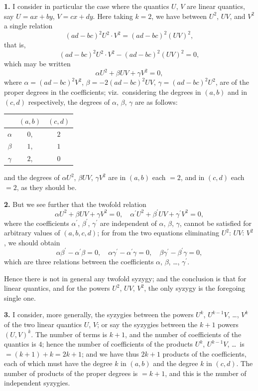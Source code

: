 \documentclass[11pt,a4paper]{book}
\begin{document}
{{{\textbf{1.} I consider in particular the case where the quantics $U$, $V$ are linear quantics,
say $U = ax + by$, $V = cx + dy$. Here taking $k = 2$, we have between $U^2$, $UV$,
and $V^2$ a single relation
\[
(ad - bc)^2 U^2 \cdot V^2 = (ad - bc)^2 (UV)^2,
\]
that is,
\[
(ad - bc)^2 U^2 \cdot V^2 - (ad - bc)^2 (UV)^2 = 0,
\]
which may be written
\[
\alpha U^2 + \beta UV + \gamma V^2 = 0,
\]
where $\alpha = (ad - bc)^2 V^2$, $\beta = -2(ad - bc)^2 UV$, $\gamma = (ad - bc)^2 U^2$, are of the
proper degrees in the coefficients; viz.~considering the degrees in $(a, b)$ and in
$(c, d)$ respectively, the degrees of $\alpha$, $\beta$, $\gamma$ are as follows:
\begin{center}
\begin{tabular}{c|cc}
& $(a, b)$ & $(c, d)$ \\
\hline
$\alpha$ & $0$, & $2$ \\
$\beta$ & $1$, & $1$ \\
$\gamma$ & $2$, & $0$
\end{tabular}
\end{center}
and the degrees of $\alpha U^2$, $\beta UV$, $\gamma V^2$ are in $(a, b)$ each $= 2$, and in $(c, d)$
each $= 2$, as they should be.

\newpage
\textbf{2.} But we see further that the twofold relation
\[
\alpha U^2 + \beta UV + \gamma V^2 = 0, \quad \alpha^\prime U^2 + \beta^\prime UV + \gamma^\prime V^2 = 0,
\]
where the coefficients $\alpha^\prime$, $\beta^\prime$, $\gamma^\prime$ are independent of $\alpha$, $\beta$, $\gamma$, cannot be satisfied
for arbitrary values of $(a, b, c, d)$; for from the two equations eliminating $U^2$:
$UV$:
$V^2$, we should obtain
\[
\alpha\beta^\prime - \alpha^\prime\beta = 0, \quad \alpha\gamma^\prime - \alpha^\prime\gamma = 0, \quad \beta\gamma^\prime - \beta^\prime\gamma = 0,
\]
which are three relations between the coefficients $\alpha$, $\beta$, \ldots, $\gamma^\prime$.

Hence there is not in general any twofold syzygy; and the conclusion is that
for linear quantics, and for the powers $U^2$, $UV$, $V^2$, the only syzygy is the foregoing
single one.

\textbf{3.} I consider, more generally, the syzygies between the powers $U^k$,
$U^{k-1}V$, \ldots, $V^k$ of the two linear quantics $U$, $V$; or say the syzygies between the
$k + 1$ powers $(U, V)^k$. The number of terms is $k + 1$, and the number of
coefficients of the quantics is $4$; hence the number of coefficients of the products
$U^k$, $U^{k-1}V$, \ldots\ is $= (k + 1) + k = 2k + 1$; and we have thus $2k + 1$ products of
the coefficients, each of which must have the degree $k$ in $(a, b)$ and the degree $k$
in $(c, d)$. The number of products of the proper degrees is $= k + 1$, and this is the
number of independent syzygies.

}}}
\end{document}
